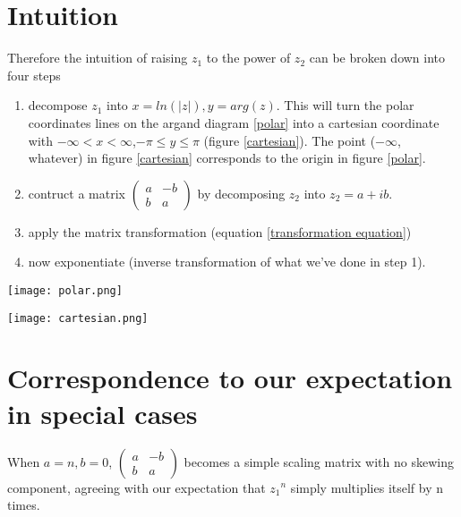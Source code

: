 \documentclass[a4paper, 12pt]{article}
\begin{document}
\section{Intuition}
Therefore the intuition of raising $z_1$ to the power of $z_2$ can be broken down into four steps
\begin{enumerate}
    \item decompose $z_1$ into $x=ln(|z|), y=arg(z)$. This will turn the polar coordinates lines on the argand diagram \ref{polar} into a cartesian coordinate with $-\infty < x < \infty$,$ -\pi\le y\le \pi$ (figure \ref{cartesian}). The point ($-\infty$, whatever) in figure \ref{cartesian} corresponds to the origin in figure \ref{polar}.
    \item contruct a matrix 
    $\begin{pmatrix}
    a & -b\\
    b & a
    \end{pmatrix}$ by decomposing $z_2$ into $z_2=a+ib$.
    \item apply the matrix transformation (equation \ref{transformation equation})
    \item now exponentiate (inverse transformation of what we've done in step 1).
\end{enumerate}

\begin{minipage}[b]{0.4\textwidth}
    \texttt{[image: polar.png]}
    \label{polar}
\end{minipage}
  \hfill
\begin{minipage}[b]{0.4\textwidth}
    \texttt{[image: cartesian.png]}
    \label{cartesian}
\end{minipage}

\section{Correspondence to our expectation in special cases}
When $a=n, b=0$, 
$\begin{pmatrix}
a & -b\\
b & a
\end{pmatrix}$ becomes a simple scaling matrix with no skewing component, agreeing with our expectation that ${z_1}^{n}$ simply multiplies itself by n times.
\end{document}
